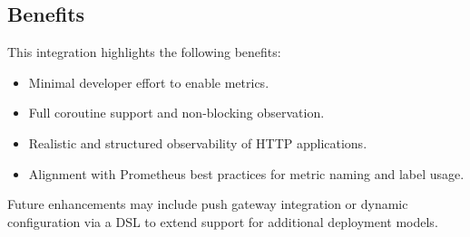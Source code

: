 \subsection*{Benefits}
This integration highlights the following benefits:
\begin{itemize}
  \item Minimal developer effort to enable metrics.
  \item Full coroutine support and non-blocking observation.
  \item Realistic and structured observability of HTTP applications.
  \item Alignment with Prometheus best practices for metric naming and label usage.
\end{itemize}

Future enhancements may include push gateway integration or dynamic configuration via a DSL to extend support for additional deployment models.

